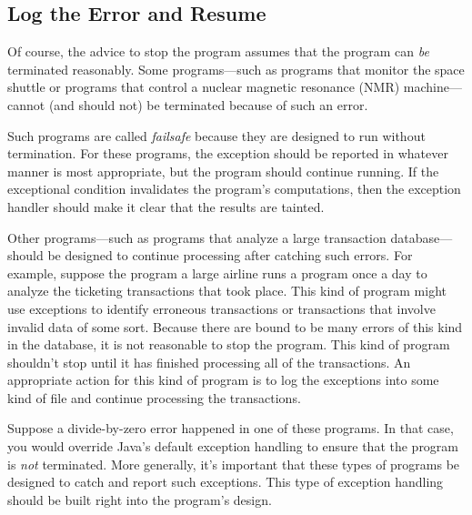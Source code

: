 \subsection{Log the Error and Resume}
\noindent Of course, the advice to stop the program assumes that the program can
{\it be} terminated reasonably.  Some programs---such as programs that
monitor the space shuttle or programs that control a nuclear magnetic
resonance (NMR) machine---cannot (and should not) be terminated
because of such an error.

Such programs are called {\it failsafe} because they are designed to
run without termination.  For these programs, the exception should be
reported in whatever manner is most appropriate, but the program
should continue running.  If the
exceptional condition invalidates the program's computations, then
the exception handler should make it clear that the results are
tainted.

Other programs---such as programs that analyze a large transaction
database---should be designed to continue processing after catching
such errors.  For example, suppose the program a large
airline runs a program once a day to analyze the ticketing transactions that
took place.  This kind of program might use exceptions to identify
erroneous transactions or transactions that involve invalid data of
some sort.  Because there are bound to be many errors of this kind in the
database, it is not reasonable to stop the program.  This kind of
program shouldn't stop until it has finished processing all of the
transactions.  An appropriate action for this kind of program is to
log the exceptions into some kind of file and continue processing the
transactions.


Suppose a divide-by-zero error happened in one of these programs.   In
that case, you would override Java's default exception handling to
ensure that the program is {\it not} terminated.   More generally, it's
important that these types of programs be designed to catch and report
such exceptions.  This type of exception handling should be built right
into the program's design.


